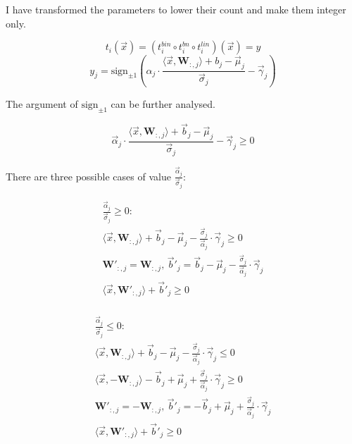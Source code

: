 \documentclass{fithesis}
\newcommand{\mat}[1]{\mathbf{#1}}
\newcommand{\sign}{\mathrm{sign}}
\begin{document}
I have transformed the parameters to lower their count and make them integer only.

\begin{equation*}
    t_i(\vec x) = (t_i^{bin} \circ t_i^{bn} \circ t_i^{lin})(\vec x) = y
\end{equation*}
\begin{equation*}
    y_j = \sign_{\pm 1}\left( \alpha_j \cdot \frac{\langle \vec x, \mat W_{:, j}\rangle + b_j - \vec \mu_j}{\vec \sigma_j} - \vec \gamma_j \right)
\end{equation*}

The argument of $\sign_{\pm 1}$ can be further analysed.

\begin{equation*}
    \vec \alpha_j \cdot \frac{\langle \vec x, \mat W_{:, j}\rangle + \vec b_j - \vec \mu_j}{\vec \sigma_j} - \vec \gamma_j \geq 0
\end{equation*}

There are three possible cases of value $\frac{\vec \alpha_j}{\vec \sigma_j}$:

\begin{equation*}
    \begin{matrix}
        \frac{\vec\alpha_j}{\vec\sigma_j} \geq 0: \\
        \langle \vec x, \mat W_{:, j}\rangle + \vec b_j - \vec \mu_j - \frac{\vec \sigma_j}{\vec\alpha_j}\cdot \vec \gamma_j \geq 0\\
        \mat W'_{:, j} = \mat W_{:, j}, \,
        \vec b'_j = \vec b_j - \vec\mu_j - \frac{\vec\sigma_j}{\vec\alpha_j}\cdot \vec\gamma_j\\
        \langle \vec x, \mat W'_{:, j}\rangle + \vec b'_j \geq 0\\
    \end{matrix}
\end{equation*}

\begin{equation*}
    \begin{matrix}
        \frac{\vec\alpha_j}{\vec\sigma_j} \leq 0: \\
        \langle \vec x, \mat W_{:, j}\rangle + \vec b_j - \vec \mu_j - \frac{\vec \sigma_j}{\vec\alpha_j}\cdot \vec \gamma_j \leq 0 \\
        \langle \vec x, -\mat W_{:, j}\rangle - \vec b_j + \vec \mu_j + \frac{\vec \sigma_j}{\vec\alpha_j}\cdot \vec \gamma_j \geq 0\\
        \mat W'_{:, j} = -\mat W_{:, j}, \,
        \vec b'_j = -\vec b_j + \vec\mu_j + \frac{\vec\sigma_j}{\vec\alpha_j}\cdot \vec\gamma_j\\
        \langle \vec x, \mat W'_{:, j}\rangle + \vec b'_j \geq 0\\
    \end{matrix}
\end{equation*}
\end{document}
